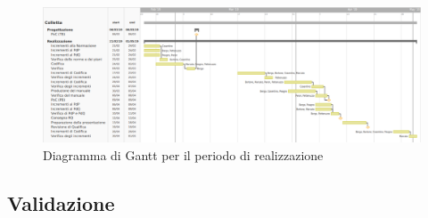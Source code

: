 	\newpage
	\begin{figure}[!hbtp]
		\centering
		\includegraphics[scale=0.5, angle=90]{images/ganttreal.png}
		\caption{Diagramma di Gantt per il periodo di realizzazione}
	\end{figure}
	
	\newpage
	\subsection{Validazione}
		